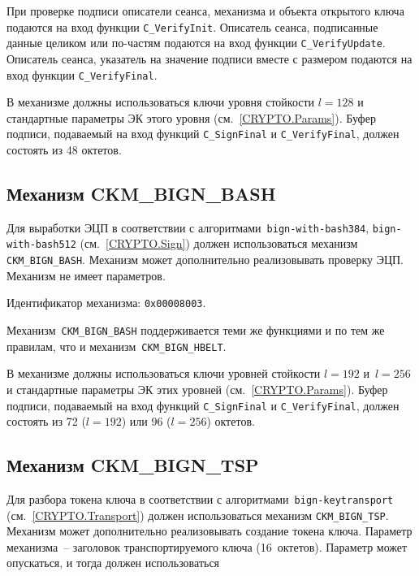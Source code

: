 При проверке подписи описатели сеанса, механизма и объекта
открытого ключа подаются на вход функции \verb|C_VerifyInit|.
Описатель сеанса, подписанные данные целиком или по-частям подаются
на вход функции \verb|C_VerifyUpdate|.
Описатель сеанса, указатель на значение подписи вместе с размером
подаются на вход функции \verb|C_VerifyFinal|.

В механизме должны использоваться ключи уровня стойкости $l=128$ 
и стандартные параметры ЭК этого уровня (см.~\ref{CRYPTO.Params}).
% 
Буфер подписи, подаваемый на вход функций \verb|C_SignFinal| и 
\verb|C_VerifyFinal|, должен состоять из 48 октетов.

\subsection{Механизм CKM\_BIGN\_BASH}

Для выработки ЭЦП в соответствии с алгоритмами~\texttt{bign-with-bash384},
\texttt{bign-with-bash512} (см.~\ref{CRYPTO.Sign}) должен использоваться 
механизм \verb|CKM_BIGN_BASH|. Механизм может дополнительно реализовывать 
проверку ЭЦП.
%
Механизм не имеет параметров.

Идентификатор механизма: \texttt{0x00008003}.

Механизм~\verb|CKM_BIGN_BASH| поддерживается теми же функциями и по тем же 
правилам, что и механизм~\verb|CKM_BIGN_HBELT|.

В механизме должны использоваться ключи уровней стойкости $l=192$ и~$l=256$
и стандартные параметры ЭК этих уровней (см.~\ref{CRYPTO.Params}).
% 
Буфер подписи, подаваемый на вход функций \verb|C_SignFinal| и 
\verb|C_VerifyFinal|, должен состоять из 72 ($l=192$) или 96 ($l=256$) 
октетов. 

\subsection{Механизм CKM\_BIGN\_TSP}


Для разбора токена ключа в соответствии с алгоритмами~\texttt{bign-keytransport}
(см.~\ref{CRYPTO.Transport}) должен использоваться механизм \verb|CKM_BIGN_TSP|. 
Механизм может дополнительно реализовывать создание токена ключа.
%
Параметр механизма~-- заголовок транспортируемого ключа (16~октетов). 
Параметр может опускаться, и тогда должен использоваться

